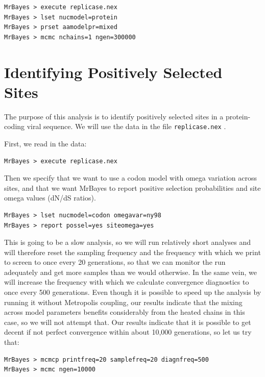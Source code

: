 \documentclass[12pt]{book}
\newcommand{\ttt}[1]{\texttt{#1} }
\begin{document}
\begin{singlespacing}
\begin{verbatim}
MrBayes > execute replicase.nex
MrBayes > lset nucmodel=protein
MrBayes > prset aamodelpr=mixed
MrBayes > mcmc nchains=1 ngen=300000
\end{verbatim}
\end{singlespacing}

\section{Identifying Positively Selected Sites}
The purpose of this analysis is to identify positively selected sites in a protein-coding viral
sequence.  We will use the data in the file \ttt{replicase.nex}.

First, we read in the data:

\begin{verbatim}
MrBayes > execute replicase.nex
\end{verbatim}

Then we specify that we want to use a codon model with omega variation across sites, and that we
want MrBayes to report positive selection probabilities and site omega values (dN/dS ratios).

\begin{singlespacing}
\begin{verbatim}
MrBayes > lset nucmodel=codon omegavar=ny98
MrBayes > report possel=yes siteomega=yes
\end{verbatim}
\end{singlespacing}

This is going to be a slow analysis, so we will run relatively short analyses and will therefore
reset the sampling frequency and the frequency with which we print to screen to once every 20
generations, so that we can monitor the run adequately and get more samples than we would
otherwise. In the same vein, we will increase the frequency with which we calculate convergence
diagnostics to once every 500 generations. Even though it is possible to speed up the analysis by
running it without Metropolis coupling, our results indicate that the mixing across model
parameters benefits considerably from the heated chains in this case, so we will not attempt that.
Our results indicate that it is possible to get decent if not perfect convergence within about
10,000 generations, so let us try that:

\begin{singlespacing}
\begin{verbatim}
MrBayes > mcmcp printfreq=20 samplefreq=20 diagnfreq=500
MrBayes > mcmc ngen=10000
\end{verbatim}
\end{singlespacing}
\end{document}
